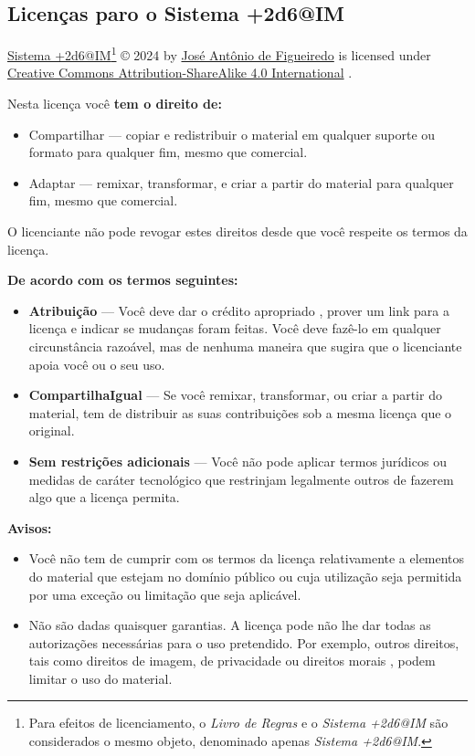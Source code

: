 \subsection*{Licenças paro o Sistema +2d6@IM}
\href{https://github.com/josefigueiredo/Sistema2d6-ifsul}{Sistema +2d6@IM}\footnote{Para efeitos de licenciamento, o \emph{Livro de Regras} e o \emph{Sistema +2d6@IM} são considerados o mesmo objeto, denominado apenas \emph{Sistema +2d6@IM}.} © 2024 by \href{https://josefigueiredo.github.io/}{José Antônio de Figueiredo} is licensed under \href{https://creativecommons.org/licenses/by-sa/4.0/?ref=chooser-v1}{Creative Commons Attribution-ShareAlike 4.0 International} \ccbysa.

Nesta licença você \textbf{tem o direito de:}
\begin{itemize}
	\item Compartilhar — copiar e redistribuir o material em qualquer suporte ou formato para qualquer fim, mesmo que comercial.
	\item Adaptar — remixar, transformar, e criar a partir do material para qualquer fim, mesmo que comercial.
\end{itemize}

O licenciante não pode revogar estes direitos desde que você respeite os termos da licença.

\textbf{De acordo com os termos seguintes:}\\
\begin{itemize}
	\item \ccAttribution \textbf{ Atribuição} — Você deve dar o crédito apropriado , prover um link para a licença e indicar se mudanças foram feitas. Você deve fazê-lo em qualquer circunstância razoável, mas de nenhuma maneira que sugira que o licenciante apoia você ou o seu uso.
	\item \ccShare \textbf{ CompartilhaIgual} — Se você remixar, transformar, ou criar a partir do material, tem de distribuir as suas contribuições sob a mesma licença que o original.
	\item \textbf{Sem restrições adicionais} — Você não pode aplicar termos jurídicos ou medidas de caráter tecnológico que restrinjam legalmente outros de fazerem algo que a licença permita.	
\end{itemize}

\textbf{Avisos:}
\begin{itemize}
	\item Você não tem de cumprir com os termos da licença relativamente a elementos do material que estejam no domínio público ou cuja utilização seja permitida por uma exceção ou limitação que seja aplicável.
	\item Não são dadas quaisquer garantias. A licença pode não lhe dar todas as autorizações necessárias para o uso pretendido. Por exemplo, outros direitos, tais como direitos de imagem, de privacidade ou direitos morais , podem limitar o uso do material.
\end{itemize}
